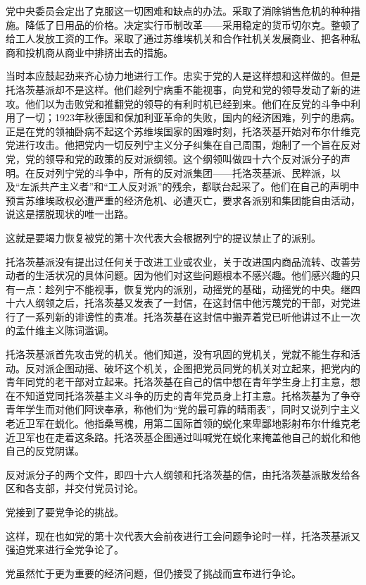 党中央委员会定出了克服这一切困难和缺点的办法。采取了消除销售危机的种种措施。降低了日用品的价格。决定实行币制改革——采用稳定的货币切尔克。整顿了给工人发放工资的工作。采取了通过苏维埃机关和合作社机关发展商业、把各种私商和投机商从商业中排挤出去的措施。

当时本应鼓起劲来齐心协力地进行工作。忠实于党的人是这样想和这样做的。但是托洛茨基派却不是这样。他们趁列宁病重不能视事，向党和党的领导发动了新的进攻。他们以为击败党和推翻党的领导的有利时机已经到来。他们在反党的斗争中利用了一切；1923年秋德国和保加利亚革命的失败，国内的经济困难，列宁的患病。正是在党的领袖卧病不起这个苏维埃国家的困难时刻，托洛茨基开始对布尔什维克党进行攻击。他把党内一切反列宁主义分子纠集在自己周围，炮制了一个旨在反对党，党的领导和党的政策的反对派纲领。这个纲领叫做四十六个反对派分子的声明。在反对列宁党的斗争中，所有的反对派集团——托洛茨基派、民粹派，以及“左派共产主义者”和“工人反对派”的残余，都联台起采了。他们在自己的声明中预言苏维埃政权必遭严重的经济危机、必遭灭亡，要求各派别和集团能自由活动，说这是摆脱现状的唯一出路。

这就是要竭力恢复被党的第十次代表大会根据列宁的提议禁止了的派别。

托洛茨基派没有提出过任何关于改进工业或农业，关于改进国内商品流转、改善劳动者的生活状况的具体问题。因为他们对这些问题根本不感兴趣。他们感兴趣的只有一点：趁列宁不能视事，恢复党内的派别，动摇党的基础，动摇党的中央。继四十六人纲领之后，托洛茨基又发表了一封信，在这封信中他污蔑党的干部，对党进行了一系列新的诽谤性的责准。托洛茨基在这封信中搬弄着党已听他讲过不止一次的孟什维主义陈词滥调。

托洛茨基派首先攻击党的机关。他们知道，没有巩固的党机关，党就不能生存和活动。反对派企图动摇、破坏这个机关，企图把党员同党的机关对立起来，把党内的青年同党的老干部对立起来。托洛茨基在自己的信中想在青年学生身上打主意，想在不知道党同托洛茨基主义斗争的历史的青年党员身上打主意。托格茨基为了争夺青年学生而对他们阿谀奉承，称他们为“党的最可靠的晴雨表”，同时又说列宁主义老近卫军在蜕化。他指桑骂槐，用第二国际首领的蜕化来卑鄙地影射布尔什维克老近卫军也在走着这条路。托洛茨基企图通过叫喊党在蜕化来掩盖他自己的蜕化和他自己的反党阴谋。

反对派分子的两个文件，即四十六人纲领和托洛茨基的信，由托洛茨基派散发给各区和各支部，并交付党员讨论。

党接到了要党争论的挑战。

这样，现在也如党的第十次代表大会前夜进行工会问题争论时一样，托洛茨基派又强迫党来进行全党争论了。

党虽然忙于更为重要的经济问题，但仍接受了挑战而宣布进行争论。

